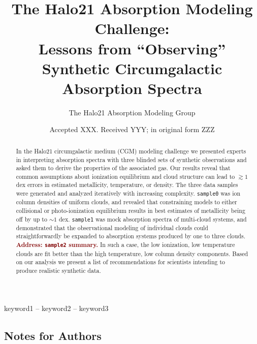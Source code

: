 \documentclass[fleqn,usenatbib]{mnras}
\title[``Observing'' Synthetic Circumgalactic Absorption Spectra]{The Halo21 Absorption Modeling Challenge:\\Lessons from ``Observing'' Synthetic Circumgalactic Absorption Spectra}
\author[]{
The Halo21 Absorption Modeling Group
\\
}
\date{Accepted XXX. Received YYY; in original form ZZZ}
\newcommand{\todo}[1]{\textcolor{Maroon}{\textbf{Address: #1}}}
\begin{document}
\label{firstpage}
\pagerange{\pageref{firstpage}--\pageref{lastpage}}
\maketitle

\begin{abstract}
In the Halo21 circumgalactic medium (CGM) modeling challenge we presented experts in interpreting absorption spectra with three blinded sets of synthetic observations and asked them to derive the properties of the associated gas.
Our results reveal that common assumptions about ionization equilibrium and cloud structure can lead to $\gtrsim 1$ dex errors in estimated metallicity, temperature, or density.
The three data samples were generated and analyzed iteratively with increasing complexity.
\texttt{sample0} was ion column densities of uniform clouds, and revealed that constraining models to either collisional or photo-ionization equilibrium results in best estimates of metallicity being off by up to $\sim 1$ dex.
\texttt{sample1} was mock absorption spectra of multi-cloud systems, and demonstrated that the observational modeling of individual clouds could straightforwardly be expanded to absorption systems produced by one to three clouds.
\todo{\texttt{sample2} summary.}
In such a case, the low ionization, low temperature clouds are fit better than the high temperature, low column density components.
Based on our analysis we present a list of recommendations for scientists intending to produce realistic synthetic data.
\end{abstract}

\begin{keywords}
keyword1 -- keyword2 -- keyword3
\end{keywords}



\subsection{Notes for Authors}
\end{document}
